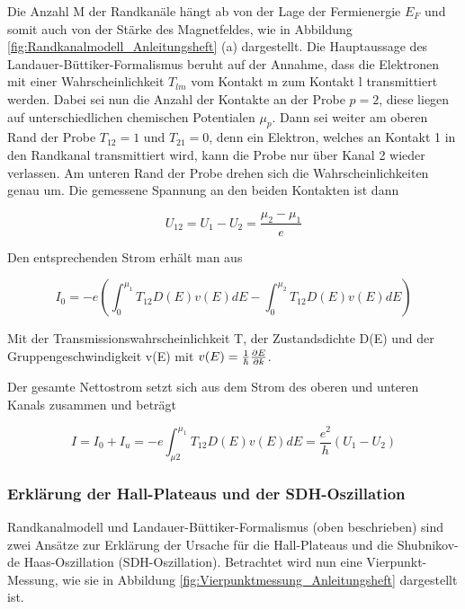 Die Anzahl M der Randkanäle hängt ab von der Lage der Fermienergie $E_F$ und somit auch von der Stärke des Magnetfeldes, wie in Abbildung \ref{fig:Randkanalmodell_Anleitungsheft} (a) dargestellt.
Die Hauptaussage des Landauer-Büttiker-Formalismus beruht auf der Annahme, dass die Elektronen mit einer Wahrscheinlichkeit $T_{lm}$ vom Kontakt m zum Kontakt l transmittiert werden. Dabei sei nun die Anzahl der Kontakte an der Probe $p=2$, diese liegen auf unterschiedlichen chemischen Potentialen $\mu_p$. Dann sei weiter am oberen Rand der Probe $T_{12}=1$ und $T_{21}=0$, denn ein Elektron, welches an Kontakt 1 in den Randkanal transmittiert wird, kann die Probe nur über Kanal 2 wieder verlassen. Am unteren Rand der Probe drehen sich die Wahrscheinlichkeiten genau um.  
Die gemessene Spannung an den beiden Kontakten ist dann

\begin{equation}
U_{12}=U_1 - U_2= \frac{\mu_2-\mu_1}{e}
\label{eq:spannung_randkanal}
\end{equation}

Den entsprechenden Strom erhält man aus 

\begin{equation}
I_0=-e(\int^{\mu_1}_0T_{12}D(E)v(E)dE-\int^{\mu_2}_0T_{12}D(E)v(E)dE)
\label{eq:strom_randkanal}
\end{equation}

Mit der Transmissionswahrscheinlichkeit T, der Zustandsdichte D(E)
und der Gruppengeschwindigkeit v(E) mit $v(E)=\frac{1}{\hbar}\frac{\partial E}{\partial k}$.

Der gesamte Nettostrom setzt sich aus dem Strom des oberen und unteren Kanals zusammen und beträgt

\begin{equation}
I=I_0+I_u=-e\int^{\mu_1}_{\mu2}T_{12}D(E)v(E)dE=\frac{e^2}{h}(U_1-U_2)
\label{eq:randkanal_nettostrom}
\end{equation}
 

\subsubsection{Erklärung der Hall-Plateaus und der SDH-Oszillation}

Randkanalmodell und Landauer-Büttiker-Formalismus (oben beschrieben) sind zwei Ansätze zur Erklärung der Ursache für die Hall-Plateaus und die Shubnikov-de Haas-Oszillation (SDH-Oszillation). 
Betrachtet wird nun eine Vierpunkt-Messung, wie sie in Abbildung \ref{fig:Vierpunktmessung_Anleitungsheft} dargestellt ist. 

